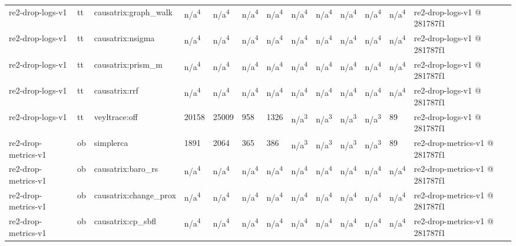 \begin{table}[t]
\begin{tabular}{lllllllllllll}
re2-drop-logs-v1 & tt & causatrix:graph\_walk & n/a\textsuperscript{4} & n/a\textsuperscript{4} & n/a\textsuperscript{4} & n/a\textsuperscript{4} & n/a\textsuperscript{4} & n/a\textsuperscript{4} & n/a\textsuperscript{4} & n/a\textsuperscript{4} & n/a\textsuperscript{4} & re2-drop-logs-v1 @ 281787f1 \\
re2-drop-logs-v1 & tt & causatrix:nsigma & n/a\textsuperscript{4} & n/a\textsuperscript{4} & n/a\textsuperscript{4} & n/a\textsuperscript{4} & n/a\textsuperscript{4} & n/a\textsuperscript{4} & n/a\textsuperscript{4} & n/a\textsuperscript{4} & n/a\textsuperscript{4} & re2-drop-logs-v1 @ 281787f1 \\
re2-drop-logs-v1 & tt & causatrix:prism\_m & n/a\textsuperscript{4} & n/a\textsuperscript{4} & n/a\textsuperscript{4} & n/a\textsuperscript{4} & n/a\textsuperscript{4} & n/a\textsuperscript{4} & n/a\textsuperscript{4} & n/a\textsuperscript{4} & n/a\textsuperscript{4} & re2-drop-logs-v1 @ 281787f1 \\
re2-drop-logs-v1 & tt & causatrix:rrf & n/a\textsuperscript{4} & n/a\textsuperscript{4} & n/a\textsuperscript{4} & n/a\textsuperscript{4} & n/a\textsuperscript{4} & n/a\textsuperscript{4} & n/a\textsuperscript{4} & n/a\textsuperscript{4} & n/a\textsuperscript{4} & re2-drop-logs-v1 @ 281787f1 \\
re2-drop-logs-v1 & tt & veyltrace:off & 20158 & 25009 & 958 & 1326 & n/a\textsuperscript{3} & n/a\textsuperscript{3} & n/a\textsuperscript{3} & n/a\textsuperscript{3} & 89 & re2-drop-logs-v1 @ 281787f1 \\
re2-drop-metrics-v1 & ob & simplerca & 1891 & 2064 & 365 & 386 & n/a\textsuperscript{3} & n/a\textsuperscript{3} & n/a\textsuperscript{3} & n/a\textsuperscript{3} & 89 & re2-drop-metrics-v1 @ 281787f1 \\
re2-drop-metrics-v1 & ob & causatrix:baro\_rs & n/a\textsuperscript{4} & n/a\textsuperscript{4} & n/a\textsuperscript{4} & n/a\textsuperscript{4} & n/a\textsuperscript{4} & n/a\textsuperscript{4} & n/a\textsuperscript{4} & n/a\textsuperscript{4} & n/a\textsuperscript{4} & re2-drop-metrics-v1 @ 281787f1 \\
re2-drop-metrics-v1 & ob & causatrix:change\_prox & n/a\textsuperscript{4} & n/a\textsuperscript{4} & n/a\textsuperscript{4} & n/a\textsuperscript{4} & n/a\textsuperscript{4} & n/a\textsuperscript{4} & n/a\textsuperscript{4} & n/a\textsuperscript{4} & n/a\textsuperscript{4} & re2-drop-metrics-v1 @ 281787f1 \\
re2-drop-metrics-v1 & ob & causatrix:cp\_sbfl & n/a\textsuperscript{4} & n/a\textsuperscript{4} & n/a\textsuperscript{4} & n/a\textsuperscript{4} & n/a\textsuperscript{4} & n/a\textsuperscript{4} & n/a\textsuperscript{4} & n/a\textsuperscript{4} & n/a\textsuperscript{4} & re2-drop-metrics-v1 @ 281787f1 \\

\end{tabular}
\end{table}
